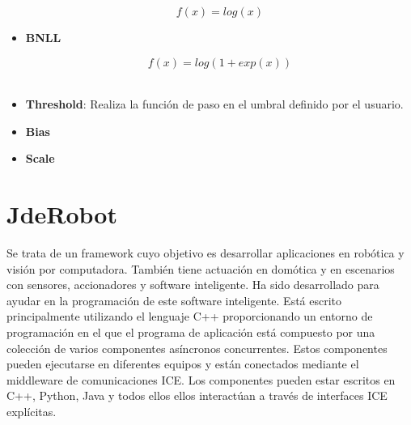 \documentclass[a4paper, 12pt, oneside]{book}
\begin{document}
\begin{itemize}
\begin{equation}
f(x) = log(x)
\end{equation}
\item \textbf{BNLL}

\begin{equation}
f(x) = log(1 + exp(x))
\end{equation}
\\
\item \textbf{Threshold}: Realiza la función de paso en el umbral definido por el usuario.
\item \textbf{Bias} 
\item \textbf{Scale}
\end{itemize}


\section{JdeRobot}

Se trata de un framework cuyo objetivo es desarrollar aplicaciones en robótica y visión por computadora. También tiene actuación en domótica y en escenarios con sensores, accionadores y software inteligente. Ha sido desarrollado para ayudar en la programación de este software inteligente. Está escrito principalmente utilizando el lenguaje C++ proporcionando un entorno de programación en el que el programa de aplicación está compuesto por una colección de varios componentes asíncronos concurrentes. Estos componentes pueden ejecutarse en diferentes equipos y están conectados mediante el middleware de comunicaciones ICE. Los componentes pueden estar escritos en C++, Python, Java y todos ellos ellos interactúan a través de interfaces ICE explícitas.\\
\end{document}
